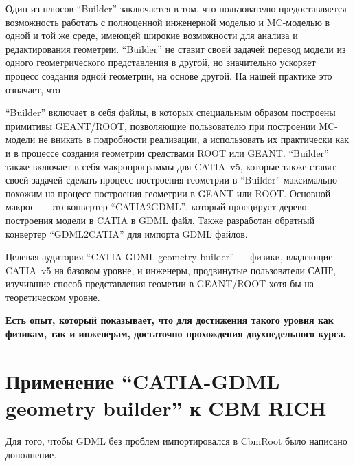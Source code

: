 Один из плюсов ``Builder'' заключается в том, что пользователю предоставляется возможность работать с полноценной инженерной моделью и MC-моделью в одной и той же среде, имеющей широкие возможности для анализа и редактирования геометрии. ``Builder'' не ставит своей задачей перевод модели из одного геометрического представления в другой, но значительно ускоряет процесс создания одной геометрии, на основе другой. На нашей практике это означает, что 

``Builder'' включает в себя файлы, в которых специальным образом построены примитивы GEANT/ROOT, позволяющие пользователю при построении MC-модели не вникать в подробности реализации, а использовать их практически как и в процессе создания геометрии средствами ROOT или GEANT. ``Builder'' также включает в себя макропрограммы для CATIA~v5, которые также ставят своей задачей сделать процесс построения геометрии в ``Builder'' максимально похожим на процесс построения геометрии в GEANT или ROOT. Основной макрос --- это конвертер ``CATIA2GDML'', который проецирует дерево построения модели в CATIA в GDML файл. Также разработан обратный конвертер ``GDML2CATIA'' для импорта GDML файлов.

Целевая аудитория ``CATIA-GDML geometry builder'' --- физики, владеющие CATIA~v5 на базовом уровне, и инженеры, продвинутые пользователи САПР, изучившие способ представления геометии в GEANT/ROOT хотя бы на теоретическом уровне.

\textbf{Есть опыт, который показывает, что для достижения такого уровня как физикам, так и инженерам, достаточно прохождения двухнедельного курса.}

\section{Применение ``CATIA-GDML geometry builder'' к CBM RICH}\label{sec:RICHgeo}

Для того, чтобы GDML без проблем импортировался в CbmRoot было написано дополнение.